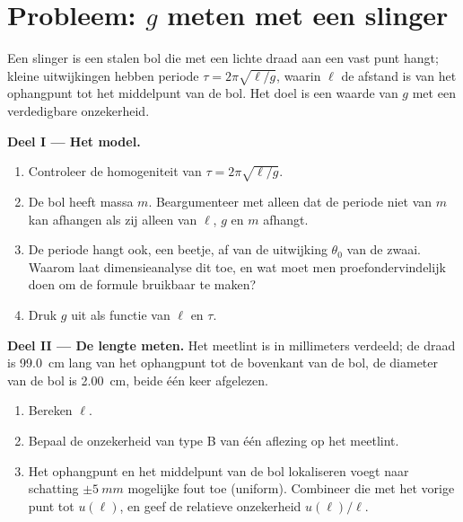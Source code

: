 \section{Probleem: $g$ meten met een slinger}

\begin{problem}
\label{pb:b1:units-dimensions:1}
Een slinger is een stalen bol die met een lichte draad aan een vast punt hangt;
kleine uitwijkingen hebben periode $\tau = 2\pi\sqrt{\ell/g}$, waarin $\ell$ de
afstand is van het ophangpunt tot het middelpunt van de bol. Het doel is een
waarde van $g$ met een verdedigbare onzekerheid.

\medskip
\noindent\textbf{Deel I --- Het model.}
\begin{enumerate}
  \item Controleer de homogeniteit van $\tau = 2\pi\sqrt{\ell/g}$.
  \item De bol heeft massa $m$. Beargumenteer met  alleen dat de
        periode niet van $m$ kan afhangen als zij alleen van $\ell$, $g$
        en $m$ afhangt.
  \item De periode hangt ook, een beetje, af van de uitwijking $\theta_0$
        van de zwaai. Waarom laat dimensieanalyse dit toe, en wat moet men
        proefondervindelijk doen om de formule bruikbaar te maken?
  \item Druk $g$ uit als functie van $\ell$ en $\tau$.
\end{enumerate}

\medskip
\noindent\textbf{Deel II --- De lengte meten.}
Het meetlint is in millimeters verdeeld; de draad is
\qty{99.0}{cm} lang van het ophangpunt tot de bovenkant van de bol, de
diameter van de bol is \qty{2.00}{cm}, beide één keer afgelezen.
\begin{enumerate}[resume]
  \item Bereken $\ell$.
  \item Bepaal de onzekerheid van type B van één aflezing op het
        meetlint.
  \item Het ophangpunt en het middelpunt van de bol lokaliseren voegt naar
        schatting $\pm\qty{5}{mm}$ mogelijke fout toe (uniform). Combineer
        die met het vorige punt tot $u(\ell)$, en geef de relatieve
        onzekerheid $u(\ell)/\ell$.
\end{enumerate}


\end{problem}
